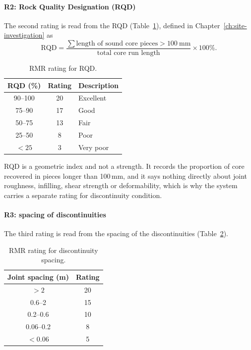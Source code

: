 \paragraph{R2: Rock Quality Designation (RQD)}
The second rating is read from the RQD (Table~\ref{tab:rmr_rqd}), defined in
Chapter~\ref{ch:site-investigation} as
\[
\text{RQD} =
\frac{
\sum \text{length of sound core pieces} > 100~\text{mm}
}
{\text{total core run length}}
\times 100\% .
\]

\begin{table}[htbp]
\caption{RMR rating for RQD.}
\label{tab:rmr_rqd}
\centering
\small
\begin{tabular}{c c l}
\toprule
\textbf{RQD (\%)} & \textbf{Rating} & \textbf{Description} \\
\midrule
90--100 & 20 & Excellent \\
75--90 & 17 & Good \\
50--75 & 13 & Fair \\
25--50 & 8 & Poor \\
\(<25\) & 3 & Very poor \\
\bottomrule
\end{tabular}
\end{table}

RQD is a geometric index and not a strength. It records the proportion of core
recovered in pieces longer than 100\,mm, and it says nothing directly about
joint roughness, infilling, shear strength or deformability, which is why the
system carries a separate rating for discontinuity condition.

\paragraph{R3: spacing of discontinuities}
The third rating is read from the spacing of the discontinuities
(Table~\ref{tab:rmr_spacing}).

\begin{table}[htbp]
\caption{RMR rating for discontinuity spacing.}
\label{tab:rmr_spacing}
\centering
\small
\begin{tabular}{c c}
\toprule
\textbf{Joint spacing (m)} & \textbf{Rating} \\
\midrule
\(>2\) & 20 \\
0.6--2 & 15 \\
0.2--0.6 & 10 \\
0.06--0.2 & 8 \\
\(<0.06\) & 5 \\
\bottomrule
\end{tabular}
\end{table}

